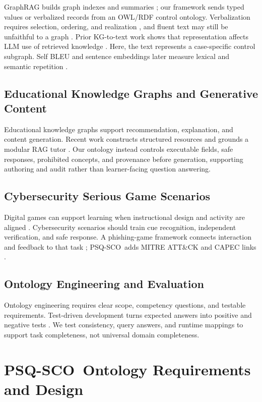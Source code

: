 \documentclass[runningheads]{llncs}
\newcommand{\sco}{PSQ-SCO}
\begin{document}
GraphRAG builds graph indexes and summaries \cite{edge2024}; our framework sends
typed values or verbalized records from an OWL/RDF control ontology. Verbalization
requires selection, ordering, and realization \cite{galanis2014}, and fluent text
may still be unfaithful to a graph \cite{hashem2023}. Prior KG-to-text work shows
that representation affects LLM use of retrieved knowledge
\cite{wu2023retrieve}. Here, the text represents a case-specific control subgraph.
Self BLEU and sentence embeddings later measure lexical and semantic repetition
\cite{reimers2019,tevet2021}.

\subsection{Educational Knowledge Graphs and Generative Content}

Educational knowledge graphs support recommendation, explanation, and content
generation. Recent work constructs structured resources
\cite{ain2026ijckg} and grounds a modular RAG tutor \cite{lai2026abel}. Our
ontology instead controls executable fields, safe responses, prohibited concepts,
and provenance before generation, supporting authoring and audit rather than
learner-facing question answering.

\subsection{Cybersecurity Serious Game Scenarios}

Digital games can support learning when instructional design and activity are
aligned \cite{clark2016}. Cybersecurity scenarios should train cue recognition,
independent verification, and safe response. A phishing-game framework connects
interaction and feedback to that task \cite{arachchilage2013}; \sco\ adds MITRE
ATT\&CK and CAPEC links \cite{mitreTaxonomies}.

\subsection{Ontology Engineering and Evaluation}

Ontology engineering requires clear scope, competency questions, and testable
requirements. Test-driven development turns expected answers into positive and
negative tests \cite{keet2016}. We test consistency, query answers, and runtime
mappings to support task completeness, not universal domain completeness.

\section{\sco\ Ontology Requirements and Design}
\end{document}
